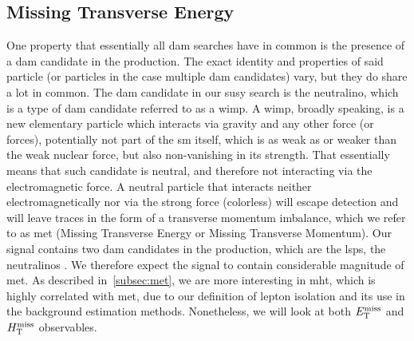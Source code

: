 \subsection{Missing Transverse Energy}
\label{subsec:signal-met-mht}
One property that essentially all \gls{dam} searches have in common is the presence of a \gls{dam} candidate in the production. The exact identity and properties of said particle (or particles in the case multiple \gls{dam}  candidates) vary, but they do share a lot in common. The \gls{dam} candidate in our \gls{susy} search is the \gls{neutralino}, which is a type of \gls{dam} candidate referred to as a \gls{wimp}. A \gls{wimp}, broadly speaking, is a new elementary particle which interacts via gravity and any other force (or forces), potentially not part of the \gls{sm} itself, which is as weak as or weaker than the weak nuclear force, but also non-vanishing in its strength. That essentially means that such candidate is neutral, and therefore not interacting via the electromagnetic force. A neutral particle that interacts neither electromagnetically nor via the strong force (\ie colorless) will escape detection and will leave traces in the form of a transverse momentum imbalance, which we refer to as \gls{met} (Missing Transverse Energy or Missing Transverse Momentum). Our signal contains two \gls{dam} candidates in the production, which are the \glspl{lsp}, the \glspl{neutralino} \neuto. We therefore expect the signal to contain considerable magnitude of \gls{met}. As described in~\ref{subsec:met},  we are more interesting in \gls{mht}, which is highly correlated with \gls{met}, due to our definition of lepton isolation and its use in the background estimation methods. Nonetheless, we will look at both $E_{\mathrm{T}}^{\text{miss}}$ and $H_{\mathrm{T}}^{\text{miss}}$ observables.
